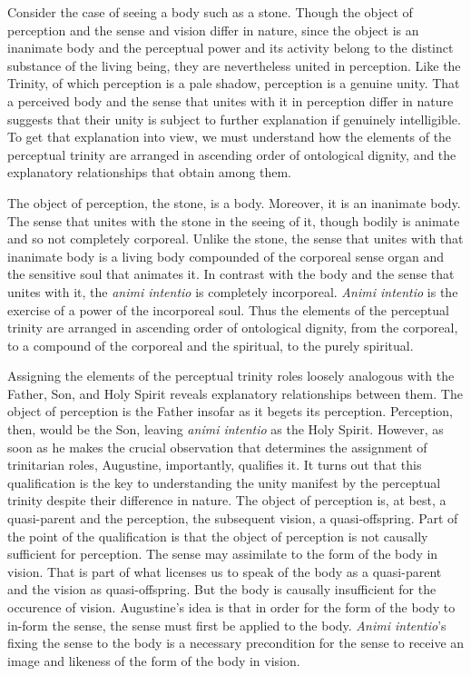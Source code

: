 \documentclass[12pt]{article}
\begin{document}
Consider the case of seeing a body such as a stone. Though the object of perception and the sense and vision differ in nature, since the object is an inanimate body and the perceptual power and its activity belong to the distinct substance of the living being, they are nevertheless united in perception. Like the Trinity, of which perception is a pale shadow, perception is a genuine unity. That a perceived body and the sense that unites with it in perception differ in nature suggests that their unity is subject to further explanation if genuinely intelligible. To get that explanation into view, we must understand how the elements of the perceptual trinity are arranged in ascending order of ontological dignity, and the explanatory relationships that obtain among them.

The object of perception, the stone, is a body. Moreover, it is an inanimate body. The sense that unites with the stone in the seeing of it, though bodily is animate and so not completely corporeal. Unlike the stone, the sense that unites with that inanimate body is a living body compounded of the corporeal sense organ and the sensitive soul that animates it. In contrast with the body and the sense that unites with it, the \emph{animi intentio} is completely incorporeal. \emph{Animi intentio} is the exercise of a power of the incorporeal soul. Thus the elements of the perceptual trinity are arranged in ascending order of ontological dignity, from the corporeal, to a compound of the corporeal and the spiritual, to the purely spiritual.

Assigning the elements of the perceptual trinity roles loosely analogous with the Father, Son, and Holy Spirit reveals explanatory relationships between them. The object of perception is the Father insofar as it begets its perception. Perception, then, would be the Son, leaving \emph{animi intentio} as the Holy Spirit. However, as soon as he makes the crucial observation that determines the assignment of trinitarian roles, Augustine, importantly, qualifies it. It turns out that this qualification is the key to understanding the unity manifest by the perceptual trinity despite their difference in nature. The object of perception is, at best, a quasi-parent and the perception, the subsequent vision, a quasi-offspring. Part of the point of the qualification is that the object of perception is not causally sufficient for perception. The sense may assimilate to the form of the body in vision. That is part of what licenses us to speak of the body as a quasi-parent and the vision as quasi-offspring. But the body is causally insufficient for the occurence of vision. Augustine's idea is that in order for the form of the body to in-form the sense, the sense must first be applied to the body. \emph{Animi intentio}'s fixing the sense to the body is a necessary precondition for the sense to receive an image and likeness of the form of the body in vision. 
\end{document}
